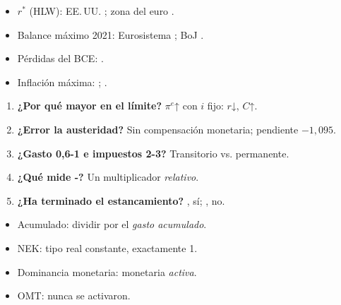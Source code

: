 \documentclass{article}
\begin{document}
\begin{columnas}
\anexorepaso
{}
\begin{itemize}
\item $r^*$ (HLW): EE.\,UU. ; zona del euro .
\item Balance máximo 2021: Eurosistema ; BoJ .
\item Pérdidas del BCE: .
\item Inflación máxima: ; .
\end{itemize}
\begin{enumerate}
\item \textbf{¿Por qué mayor en el límite?} $\pi^e$↑ con $i$ fijo: $r$↓, $C$↑.
\item \textbf{¿Error la austeridad?} Sin compensación monetaria; pendiente $-1{,}095$.
\item \textbf{¿Gasto 0,6-1 e impuestos 2-3?} Transitorio vs. permanente.
\item \textbf{¿Qué mide -?} Un multiplicador \emph{relativo}.
\item \textbf{¿Ha terminado el estancamiento?} , sí; , no.
\end{enumerate}
\begin{trampa}
\begin{itemize}
\item Acumulado: dividir por el \emph{gasto acumulado}.
\item NEK: tipo real constante, exactamente 1.
\item Dominancia monetaria: monetaria \emph{activa}.
\item OMT: nunca se activaron.
\end{itemize}
\end{trampa}

\end{columnas}
\end{document}
